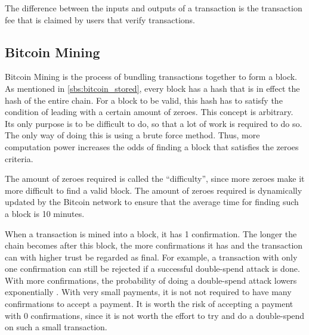 The difference between the inputs and outputs of a transaction is the transaction fee that is claimed by users that verify transactions. 

\subsection{Bitcoin Mining}

Bitcoin Mining is the process of bundling transactions together to form a block. As mentioned in \ref{sbs:bitcoin_stored}, every block has a hash that is in effect the hash of the entire chain. For a block to be valid, this hash has to satisfy the condition of leading with a certain amount of zeroes. This concept is arbitrary. Its only purpose is to be difficult to do, so that a lot of work is required to do so. The only way of doing this is using a brute force method. Thus, more computation power increases the odds of finding a block that satisfies the zeroes criteria.

The amount of zeroes required is called the ``difficulty'', since more zeroes make it more difficult to find a valid block. The amount of zeroes required is dynamically updated by the Bitcoin network to ensure that the average time for finding such a block is 10 minutes.

When a transaction is mined into a block, it has 1 confirmation. The longer the chain becomes after this block, the more confirmations it has and the transaction can with higher trust be regarded as final. For example, a transaction with only one confirmation can still be rejected if a successful double-spend attack is done. With more confirmations, the probability of doing a double-spend attack lowers exponentially \cite{Nakamoto2008}. With very small payments, it is not  not required to have  many confirmations to accept a payment. It is worth the risk of accepting a payment with 0 confirmations, since it is not worth the effort to try and do a double-spend on such a small transaction.



